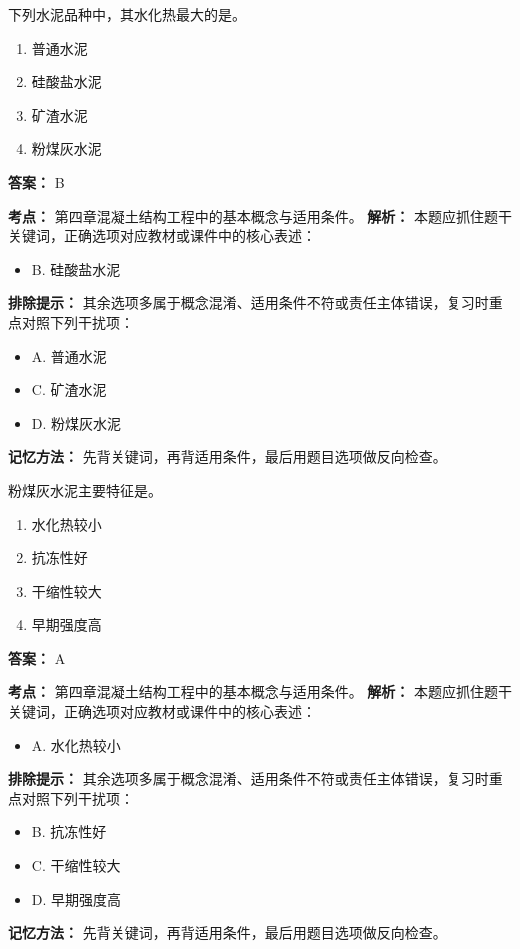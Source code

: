 \documentclass[UTF8,fontset=fandol,11pt]{ctexart}
\begin{document}
\vspace{0.2em}

\begin{quizbox}[title={第 46 题}]
下列水泥品种中，其水化热最大的是。\\
\begin{enumerate}[label=\Alph*.]
\item 普通水泥
\item 硅酸盐水泥
\item 矿渣水泥
\item 粉煤灰水泥
\end{enumerate}
\textbf{答案：} B
\vspace{0.25em}
\begin{answerbox}[title={考点解析}]
\textbf{考点：} 第四章混凝土结构工程中的基本概念与适用条件。
\textbf{解析：} 本题应抓住题干关键词，正确选项对应教材或课件中的核心表述：
\begin{itemize}
\item B. 硅酸盐水泥
\end{itemize}
\textbf{排除提示：} 其余选项多属于概念混淆、适用条件不符或责任主体错误，复习时重点对照下列干扰项：
\begin{itemize}
\item A. 普通水泥
\item C. 矿渣水泥
\item D. 粉煤灰水泥
\end{itemize}
\textbf{记忆方法：} 先背关键词，再背适用条件，最后用题目选项做反向检查。
\end{answerbox}
\end{quizbox}

\vspace{0.2em}

\begin{quizbox}[title={第 47 题}]
粉煤灰水泥主要特征是。\\
\begin{enumerate}[label=\Alph*.]
\item 水化热较小
\item 抗冻性好
\item 干缩性较大
\item 早期强度高
\end{enumerate}
\textbf{答案：} A
\vspace{0.25em}
\begin{answerbox}[title={考点解析}]
\textbf{考点：} 第四章混凝土结构工程中的基本概念与适用条件。
\textbf{解析：} 本题应抓住题干关键词，正确选项对应教材或课件中的核心表述：
\begin{itemize}
\item A. 水化热较小
\end{itemize}
\textbf{排除提示：} 其余选项多属于概念混淆、适用条件不符或责任主体错误，复习时重点对照下列干扰项：
\begin{itemize}
\item B. 抗冻性好
\item C. 干缩性较大
\item D. 早期强度高
\end{itemize}
\textbf{记忆方法：} 先背关键词，再背适用条件，最后用题目选项做反向检查。
\end{answerbox}
\end{quizbox}
\end{document}
